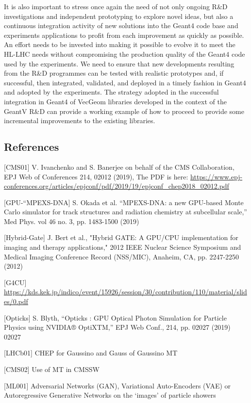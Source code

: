 \documentclass[11pt,a4paper]{article}
\begin{document}
It is also important to stress once again the need of not only ongoing
R\&D investigations and independent prototyping to explore novel ideas,
but also a continuous integration activity of new solutions into the
Geant4 code base and experiments applications to profit from each
improvement as quickly as possible. An effort needs to be invested into
making it possible to evolve it to meet the HL-LHC needs without
compromising the production quality of the Geant4 code used by the
experiments. We need to ensure that new developments resulting from the
R\&D programmes can be tested with realistic prototypes and, if
successful, then integrated, validated, and deployed in a timely fashion
in Geant4 and adopted by the experiments. The strategy adopted in the
successful integration in Geant4 of VecGeom libraries developed in the
context of the GeantV R\&D can provide a working example of how to
proceed to provide some incremental improvements to the existing
libraries.

\hypertarget{references-1}{%
\subsection{References}\label{references-1}}

{[}CMS01{]} V. Ivanchenko and S. Banerjee on behalf of the CMS
Collaboration, EPJ Web of Conferences 214, 02012 (2019), The PDF is
here:
\url{https://www.epj-conferences.org/articles/epjconf/pdf/2019/19/epjconf_chep2018_02012.pdf}

{[}GPU-``MPEXS-DNA{]} S. Okada et al. ``MPEXS-DNA: a new GPU-based Monte
Carlo simulator for track structures and radiation chemistry at
subcellular scale,'' Med Phys. vol 46 no. 3, pp. 1483-1500 (2019)

{[}Hybrid-Gate{]} J. Bert et al., "Hybrid GATE: A GPU/CPU implementation
for imaging and therapy applications," 2012 IEEE Nuclear Science
Symposium and Medical Imaging Conference Record (NSS/MIC), Anaheim, CA,
pp. 2247-2250 (2012)

{[}G4CU{]}
\url{https://kds.kek.jp/indico/event/15926/session/30/contribution/110/material/slides/0.pdf}

{[}Opticks{]} S. Blyth, ``Opticks : GPU Optical Photon Simulation for
Particle Physics using NVIDIA® OptiXTM,'' EPJ Web Conf., 214, pp. 02027
(2019) 02027

{[}LHCb01{]} CHEP for Gaussino and Gauss of Gaussino MT

{[}CMS02{]} Use of MT in CMSSW

{[}ML001{]} Adversarial Networks (GAN), Variational Auto-Encoders (VAE)
or Autoregressive Generative Networks on the `images' of particle
showers
\end{document}

